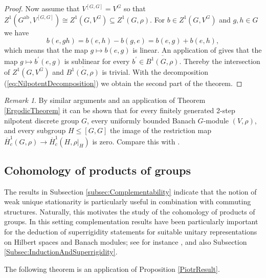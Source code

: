 \documentclass[a4paper,11pt,reqno]{amsart}
\numberwithin{equation}{section}
\theoremstyle{definition}
\theoremstyle{remark}
\theoremstyle{remark}
\newtheorem{remark}[theorem]{Remark}
\begin{document}
\begin{proof}
Now assume that $V^{[G,G]}=V^{G}$ so that $Z^{1}(G^{\text{ab}},V^{[G,G]})\cong Z^{1}(G,V^{G})\subseteq Z^{1}(G,\rho)$. For $b\in Z^{1}(G,V^{G})$ and $g,h\in G$ we have 
\[
b(e,gh)=b(e,h)-b(g,e)=b(e,g)+b(e,h),
\]
which means that the map $g\mapsto b(e,g)$ is linear. An application of \cite[Corollary 3.3]{CTV07} gives that the map $g\mapsto b^{\prime}(e,g)$ is sublinear for every $b^{\prime}\in\overline{B^{1}(G,\rho)}$. Thereby the intersection of $Z^{1}(G,V^{G})$ and $\overline{B^{1}(G,\rho)}$ is trivial. With the decomposition (\ref{eq:NilpotentDecomposition}) we obtain the second part of the theorem. \end{proof}

\begin{remark} By similar arguments and an application of Theorem \ref{ErgodicTheorem} it can be shown that for every finitely generated 2-step nilpotent discrete group $G$, every uniformly bounded Banach $G$-module $(V,\rho)$, and every subgroup $H\leq[G,G]$ the image of the restriction map $\overline{H}_{c}^{1}(G,\rho)\rightarrow\overline{H}_{c}^{1}(H,\rho|_{H})$ is zero. Compare this with \cite[Theorem 8]{FernosValette12}. \end{remark}

\vspace{3mm}


\subsection{Cohomology of products of groups\label{subsec:Cohomology-of-products}}

The results in Subsection \ref{subsec:Complementability} indicate that the notion of weak unique stationarity is particularly useful in combination with commuting structures. Naturally, this motivates the study of the cohomology of products of groups. In this setting complementation results have been particularly important for the deduction of superrigidity statements for suitable unitary representations on Hilbert spaces and Banach modules; see for instance \cite{Shalom00}, \cite{BaderFurmanGelanderMonod} and also Subsection \ref{Subsec:InductionAndSuperrigidity}.

The following theorem is an application of Proposition \ref{PiotrResult}.
\end{document}
